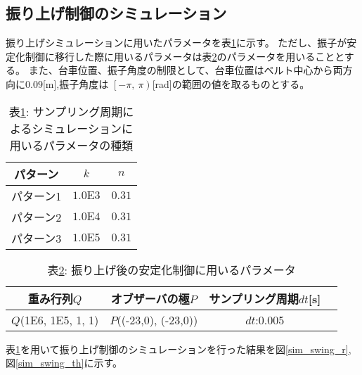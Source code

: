 \subsection{振り上げ制御のシミュレーション}
振り上げシミュレーションに用いたパラメータを表\ref{sim_swing}に示す。
ただし、振子が安定化制御に移行した際に用いるパラメータは表\ref{swing_stable}のパラメータを用いることとする。
また、台車位置、振子角度の制限として、台車位置はベルト中心から両方向に$0.09$[m],振子角度は
$\left[-\pi\right.,\ \left.\pi\right)$[rad]の範囲の値を取るものとする。

\begin{table}[htbp]
    \begin{center}
        \caption{表\ref{sim_swing}: サンプリング周期によるシミュレーションに用いるパラメータの種類}
        \begin{tabular}{|c|c|c|} \hline
            パターン & $k$ & $n$ \\ \hline \hline
            パターン1 & $1.0\mbox{E}3$ & $0.31$ \\ \hline
            パターン2 & $1.0\mbox{E}4$ & $0.31$ \\ \hline
            パターン3 & $1.0\mbox{E}5$ & $0.31$ \\ \hline
        \end{tabular}
        \label{sim_swing}
    \end{center}
\end{table}

\begin{table}[htbp]
    \begin{center}
        \caption{表\ref{swing_stable}: 振り上げ後の安定化制御に用いるパラメータ}
        \begin{tabular}{|c|c|c|c|} \hline
            重み行列$Q$ & オブザーバの極$P$ & サンプリング周期$dt$[s] \\ \hline \hline
            $Q$(1E6, 1E5, 1, 1) & $P$((-23,0), (-23,0)) & $dt$:0.005 \\ \hline
          \end{tabular}
        \label{swing_stable}
    \end{center}
\end{table}

表\ref{sim_swing}を用いて振り上げ制御のシミュレーションを行った結果を図\ref{sim_swing_r},
図\ref{sim_swing_th}に示す。

